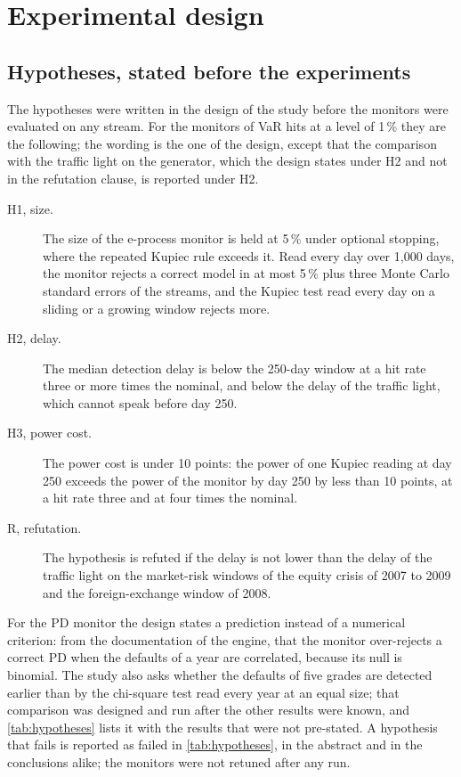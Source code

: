 \section{Experimental design}
\label{sec:experimental-design}

\subsection{Hypotheses, stated before the experiments}
\label{sec:design-hypotheses}

The hypotheses were written in the design of the study before the monitors were evaluated on any stream. For the monitors of VaR hits at a level of 1\,\% they are the following; the wording is the one of the design, except that the comparison with the traffic light on the generator, which the design states under H2 and not in the refutation clause, is reported under H2.
\begin{description}
\item[H1, size.] The size of the e-process monitor is held at 5\,\% under optional stopping, where the repeated Kupiec rule exceeds it. Read every day over 1,000 days, the monitor rejects a correct model in at most 5\,\% plus three Monte Carlo standard errors of the streams, and the Kupiec test read every day on a sliding or a growing window rejects more.
\item[H2, delay.] The median detection delay is below the 250-day window at a hit rate three or more times the nominal, and below the delay of the traffic light, which cannot speak before day 250.
\item[H3, power cost.] The power cost is under 10 points: the power of one Kupiec reading at day 250 exceeds the power of the monitor by day 250 by less than 10 points, at a hit rate three and at four times the nominal.
\item[R, refutation.] The hypothesis is refuted if the delay is not lower than the delay of the traffic light on the market-risk windows of the equity crisis of 2007 to 2009 and the foreign-exchange window of 2008.
\end{description}
For the PD monitor the design states a prediction instead of a numerical criterion: from the documentation of the engine, that the monitor over-rejects a correct PD when the
defaults of a year are correlated, because its null is binomial. The study also asks whether the defaults of five grades are detected earlier than by the chi-square test read every year at an equal size; that comparison was designed and run after the other results were known, and \cref{tab:hypotheses} lists it with the results that were not pre-stated. A hypothesis that fails is reported as failed in \cref{tab:hypotheses}, in the abstract and in the conclusions alike; the monitors were not retuned after any run.

